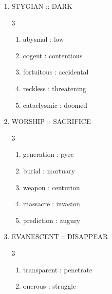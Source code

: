\documentclass[12pt]{article}
\begin{document}
\begin{enumerate}[label=\textbf{\arabic*.}]
\item STYGIAN :: DARK

\begin{multicols}{3}

\begin{enumerate}[label=(\Alph*)]

\item abysmal : low

\item cogent : contentious

\item fortuitous : accidental

\item reckless : threatening

\item cataclysmic : doomed

\end{enumerate}

\end{multicols}

\item WORSHIP :: SACRIFICE

\begin{multicols}{3}

\begin{enumerate}[label=(\Alph*)]

\item generation : pyre

\item burial : mortuary

\item weapon : centurion

\item massacre : invasion

\item prediction : augury

\end{enumerate}

\end{multicols}

\item EVANESCENT :: DISAPPEAR

\begin{multicols}{3}

\begin{enumerate}[label=(\Alph*)]

\item transparent : penetrate

\item onerous : struggle


\end{enumerate}
\end{multicols}
\end{enumerate}
\end{document}
